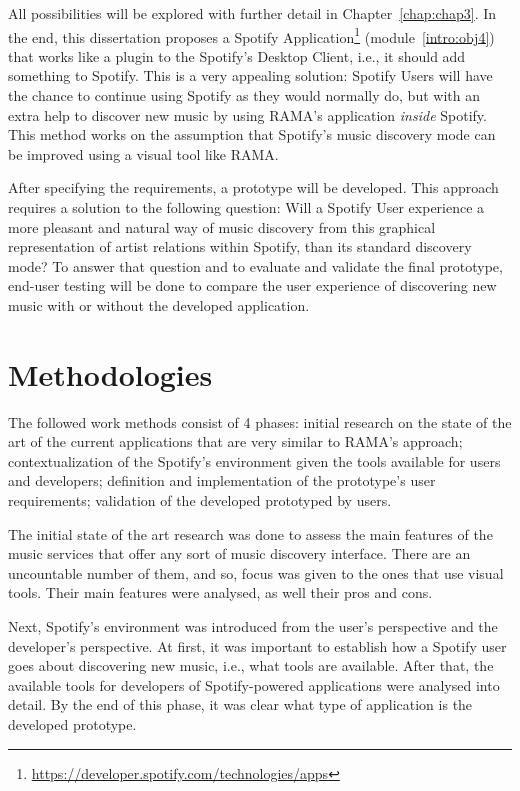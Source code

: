   All possibilities will be explored with further detail in Chapter~\ref{chap:chap3}.
  In the end, this dissertation proposes a Spotify Application\footnote{\url{https://developer.spotify.com/technologies/apps}} (module~\ref{intro:obj4}) that works like a plugin to the Spotify's Desktop Client, i.e., it should add something to Spotify.
  This is a very appealing solution: Spotify Users will have the chance to continue using Spotify as they would normally do, but with an extra help to discover new music by using RAMA's application \emph{inside} Spotify. 
  This method works on the assumption that Spotify's music discovery mode can be improved using a visual tool like RAMA.

  After specifying the requirements, a prototype will be developed.
  This approach requires a solution to the following question: Will a Spotify User experience a more pleasant and natural way of music discovery from this graphical representation of artist relations within Spotify, than its standard discovery mode?
  To answer that question and to evaluate and validate the final prototype, end-user testing will be done to compare the user experience of discovering new music with or without the developed application.

\section{Methodologies}
\label{sec:methodologies}

  The followed work methods consist of 4 phases: initial research on the state of the art of the current applications that are very similar to RAMA's approach; contextualization of the Spotify's environment given the tools available for users and developers; definition and implementation of the prototype's user requirements; validation of the developed prototyped by users.

  The initial state of the art research was done to assess the main features of the music services that offer any sort of music discovery interface.
  There are an uncountable number of them, and so, focus was given to the ones that use visual tools.
  Their main features were analysed, as well their pros and cons.

  Next, Spotify's environment was introduced from the user's perspective and the developer's perspective.
  At first, it was important to establish how a Spotify user goes about discovering new music, i.e., what tools are available.
  After that, the available tools for developers of Spotify-powered applications were analysed into detail.
  By the end of this phase, it was clear what type of application is the developed prototype.

